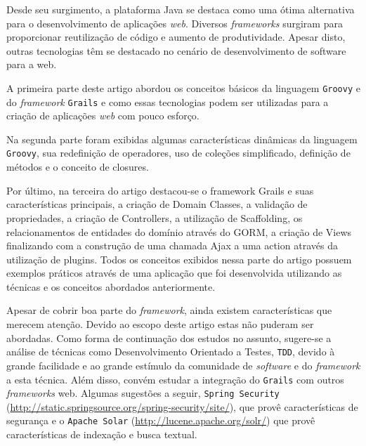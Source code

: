 \documentclass[12pt]{article}
\begin{document}
    Desde seu surgimento, a plataforma Java se destaca como uma ótima alternativa
    para o desenvolvimento de aplicações \emph{web}. Diversos \emph{frameworks} surgiram para 
    proporcionar reutilização de código e aumento de produtividade. Apesar disto,
    outras tecnologias têm se destacado no cenário de desenvolvimento de software
    para a web. 
    
    A primeira parte deste artigo abordou os conceitos básicos da linguagem \texttt{Groovy} e
    do \emph{framework} \texttt{Grails} e como essas tecnologias podem ser utilizadas 
    para a criação de aplicações \emph{web} com pouco esforço. 
    
    Na segunda parte foram exibidas algumas características dinâmicas da linguagem 
    \texttt{Groovy}, sua redefinição de operadores, uso de coleções simplificado, definição
    de métodos e o conceito de closures.
    
    Por último, na terceira do artigo destacou-se o framework Grails e suas características
    principais, a criação de Domain Classes, a validação de propriedades, a criação de Controllers,
    a utilização de Scaffolding, os relacionamentos de entidades do domínio através do
    GORM, a criação de Views finalizando com a construção de uma chamada Ajax a uma action
    através da utilização de plugins. Todos os conceitos exibidos nessa parte do artigo
    possuem exemplos práticos através de uma aplicação que foi desenvolvida utilizando 
    as técnicas e os conceitos abordados anteriormente.
    
    Apesar de cobrir boa parte do \emph{framework}, ainda existem características que 
    merecem atenção. Devido ao escopo deste artigo estas não puderam ser abordadas. 
    Como forma de continuação dos estudos no assunto, sugere-se a análise de técnicas 
    como Desenvolvimento Orientado a Testes, \texttt{TDD}, devido à grande facilidade 
    e ao grande estímulo da comunidade de \emph{software}  e do \emph{framework} a esta
    técnica. Além disso, convém estudar a integração do \texttt{Grails} com  outros 
    \emph{frameworks} web. Algumas sugestões a seguir, \texttt{Spring Security} 
    (\url{http://static.springsource.org/spring-security/site/}), que provê características
    de segurança e o \texttt{Apache Solar} (\url{http://lucene.apache.org/solr/}) que 
    provê características de indexação e busca textual.
    


\end{document}
